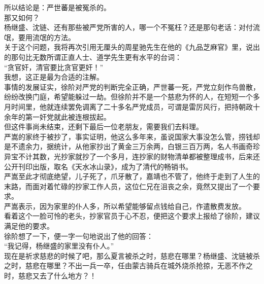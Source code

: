 \begin{multicols}{\theparacolNo}
所以结论是：严世蕃是被冤杀的。\\

那又如何？\\

杨继盛、沈链、还有那些被严党所害的人，哪一个不冤枉？还是那句老话：对付流氓，要用流氓的方法。\\

关于这个问题，我将再次引用无厘头的周星驰先生在他的《九品芝麻官》里，说出的那句比无数所谓正直人士、道学先生更有水平的台词：\\

“贪官奸，清官要比贪官更奸！”\\

我想，这正是最为合适的注解。\\

事情的发展证实，徐阶对严党的判断完全正确，严世蕃一死，严党立刻作鸟兽散，纷纷改换门庭，希望能躲过一劫。但徐阶并不是一个慈悲为怀的人，在短短一个多月时间里，他就连续罢免调离了二十多名严党成员，可谓是雷厉风行，把持朝政十余年的第一奸党就此被连根拔起。\\

但这件事尚未结束，还剩下最后一位老朋友，需要我们去料理。\\

严嵩的家终于被抄了，事实证明，他这么多年来，虽说国家大事没怎么管，捞钱却是不遗余力，据统计，从他家抄出了黄金三万余两，白银三百万两，名人书画奇珍异宝不计其数，光抄家就抄了一个多月，连抄家的财物清单都被整理成书，后来还公开刊印出版，取名《天水冰山录》，成为了清代的畅销书。\\

严嵩至此才彻底绝望，儿子死了，爪牙散了，嘉靖也不管了，他终于走到了人生的末路，而面对着忙碌的抄家工作人员，这位仁兄在沮丧之余，竟然又提出了一个要求。\\

严嵩表示，因为家里的仆人多，所以希望能够留点钱给自己，作遣散费发放。\\

看着这个一脸可怜的老头，抄家官员于心不忍，便把这个要求上报给了徐阶，建议满足他的要求。\\

徐阶想了一下，便一字一句地说出了他的回答：\\

“我记得，杨继盛的家里没有仆人。”\\

现在是祈求慈悲的时候了吧，那么夏言被杀之时，慈悲在哪里？杨继盛、沈链被杀之时，慈悲在哪里？不出一兵一卒，任由蒙古骑兵在城外烧杀抢掠，无恶不作之时，慈悲又去了什么地方？！\\


\end{multicols}
